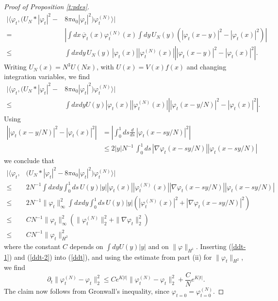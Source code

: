 \documentclass[11pt,a4paper]{article}
\begin{document}
\begin{proof}[Proof of Proposition \ref{t:pdes}]
\[ \begin{split}  \Big| \Big\langle \varphi_t, \big(U_N * |\varphi_t|^2 -& 8 \pi a_0
      |\varphi_t|^2\big) \varphi_t^{(N)} \Big\rangle \Big|  \\ = \; & \left| \int dx \, \overline{\varphi}_t (x) \varphi_t^{(N)} (x) \int dy \, U_N (y) \left( |\varphi_t (x-y)|^2 - |\varphi_t (x)|^2\right) \right|   \\ \leq 
      \; & \int dx dy \, U_N (y) \, |\varphi_t (x)| |\varphi_t^{(N)} (x)| \left| |\varphi_t (x-y)|^2 - |\varphi_t (x)|^2 \right|. 
  \end{split} \]    
Writing $U_N (x) = N^3 U (Nx)$, with $U (x) = V(x) f(x)$ and changing integration variables, we find
\[ \begin{split}
      \Big| \Big\langle \varphi_t, \big(U_N * |\varphi_t|^2 -& 8 \pi a_0
      |\varphi_t|^2\big) \varphi_t^{(N)} \Big\rangle \Big| \\ \leq \; &\int dx dy U (y) |\varphi_t (x)| |\varphi_t^{(N)} (x)| \left| |\varphi_t (x-y/N)|^2 - |\varphi_t (x)|^2 \right|.  
  \end{split} \]
Using
\[ \begin{split} \left| |\varphi_t (x-y/N)|^2 - |\varphi_t (x)|^2 \right|  & = \left| \int_0^1 ds \frac{d}{ds} \, |\varphi_t (x-sy/N)|^2 \right| \\ &\leq 2 |y| N^{-1}\, \int_0^1ds \, |\nabla \varphi_t (x-sy/N)| |\varphi_t (x-sy/N)| \end{split} \]
we conclude that
\begin{equation}\label{ddt-1} \begin{split}
      \Big| \Big\langle \varphi_t, &\big(U_N * |\varphi_t|^2 - 8 \pi a_0
      |\varphi_t|^2\big) \varphi_t^{(N)} \Big\rangle \Big| \\ \leq\; &
   2 N^{-1}   \int dx dy \int_0^1 ds \, U (y) |y| |\varphi_t (x)| |\varphi_t^{(N)} (x)| |\nabla \varphi_t (x-sy/N)| |\varphi_t (x-sy/N)| \\ \leq \; & 2 N^{-1} \| \varphi_t \|^2_\infty \int dx dy \int_0^1 ds \, U(y) |y| \left( |\varphi_t^{(N)} (x)|^2 +  |\nabla \varphi_t (x-sy/N)|^2 \right) \\ \leq \; & CN^{-1} \| \varphi_t \|_\infty^2 \left( \| \varphi_t^{(N)} \|_2^2 + \| \nabla \varphi_t \|_2^2 \right)  \\ \leq \; & CN^{-1} \| \varphi_t \|_{H^2}^2 \end{split} \end{equation}
where the constant $C$ depends on $\int dy U(y) |y|$ and on $\| \varphi \|_{H^1}$. Inserting (\ref{ddt-1}) and (\ref{ddt-2}) into (\ref{ddt}), and using the estimate from part (ii) for $\| \varphi_t \|_{H^2}$, we find
\[\partial_t \| \varphi_t^{(N)} - \varphi_t \|_{2}^2 \le C e^{K|t|} \| \varphi_t^{(N)} - \varphi_t \|_{2}^2 + \frac{C}{N} e^{K|t|}.\]
The claim now follows from Gronwall's inequality, since $\varphi_{t=0} = \varphi^{(N)}_{t=0}$. 
\end{proof}
\end{document}
